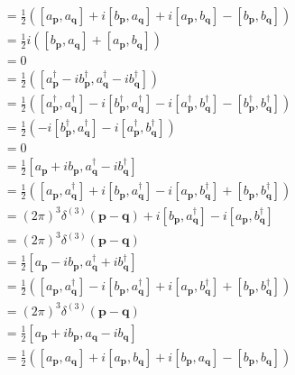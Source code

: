 \documentclass[../main.tex]{subfiles}
\begin{document}
\begin{enumerate}[(a)]
\begin{align}
&=\frac{1}{2}([a_\mathbf{p},a_\mathbf{q}]+i[b_\mathbf{p},a_\mathbf{q}]+i[a_\mathbf{p},b_\mathbf{q}]-[b_\mathbf{p},b_\mathbf{q}])\\
&=\frac{1}{2}i([b_\mathbf{p},a_\mathbf{q}]+[a_\mathbf{p},b_\mathbf{q}])\\
&=0
\end{align}
\begin{align}
[\alpha^\dagger_\mathbf{p},\alpha^\dagger_\mathbf{q}]
&=\frac{1}{2}([a^\dagger_\mathbf{p}-ib^\dagger_\mathbf{p},a^\dagger_\mathbf{q}-ib^\dagger_\mathbf{q}])\\
&=\frac{1}{2}([a^\dagger_\mathbf{p},a^\dagger_\mathbf{q}]-i[b^\dagger_\mathbf{p},a^\dagger_\mathbf{q}]-i[a^\dagger_\mathbf{p},b^\dagger_\mathbf{q}]-[b^\dagger_\mathbf{p},b^\dagger_\mathbf{q}])\\
&=\frac{1}{2}(-i[b^\dagger_\mathbf{p},a^\dagger_\mathbf{q}]-i[a^\dagger_\mathbf{p},b^\dagger_\mathbf{q}])\\
&=0
\end{align}
\begin{align}
[\alpha_\mathbf{p},\alpha^\dagger_\mathbf{q}]
&=\frac{1}{2}[a_\mathbf{p}+ib_\mathbf{p},a^\dagger_\mathbf{q}-ib^\dagger_\mathbf{q}]\\
&=\frac{1}{2}([a_\mathbf{p},a^\dagger_\mathbf{q}]+i[b_\mathbf{p},a^\dagger_\mathbf{q}]-i[a_\mathbf{p},b^\dagger_\mathbf{q}]+[b_\mathbf{p},b^\dagger_\mathbf{q}])\\
&=(2\pi)^3\delta^{(3)}(\mathbf{p}-\mathbf{q})+i[b_\mathbf{p},a^\dagger_\mathbf{q}]-i[a_\mathbf{p},b^\dagger_\mathbf{q}]\\
&=(2\pi)^3\delta^{(3)}(\mathbf{p}-\mathbf{q})
\end{align}
\begin{align}
[\beta_\mathbf{p},\beta^\dagger_\mathbf{q}]
&=\frac{1}{2}[a_\mathbf{p}-ib_\mathbf{p},a^\dagger_\mathbf{q}+ib^\dagger_\mathbf{q}]\\
&=\frac{1}{2}([a_\mathbf{p},a^\dagger_\mathbf{q}]-i[b_\mathbf{p},a^\dagger_\mathbf{q}]+i[a_\mathbf{p},b^\dagger_\mathbf{q}]+[b_\mathbf{p},b^\dagger_\mathbf{q}])\\
&=(2\pi)^3\delta^{(3)}(\mathbf{p}-\mathbf{q})
\end{align}
\begin{align}
[\alpha_\mathbf{p},\beta_\mathbf{q}]
&=\frac{1}{2}[a_\mathbf{p}+ib_\mathbf{p},a_\mathbf{q}-ib_\mathbf{q}]\\
&=\frac{1}{2}([a_\mathbf{p},a_\mathbf{q}]+i[a_\mathbf{p},b_\mathbf{q}]+i[b_\mathbf{p},a_\mathbf{q}]-[b_\mathbf{p},b_\mathbf{q}])\\

\end{align}
\end{enumerate}
\end{document}
